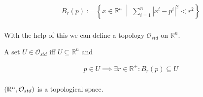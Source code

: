 \begin{align*}
    & B_r(p) := \left\{ x \in \mathbb{R}^n \; \middle| \; \sum_{i=1}^{n} | x^i - p^i |^2 < r^2 \right\} \\
\end{align*}

With the help of this we can define a topology $ \mathcal{O}_{std}$ on $ \mathbb{R}^n$.

\begin{definition}
    A set $ U \in \mathcal{O}_{std}$ iff $ U \subseteq \mathbb{R}^n$ and

    \begin{align*}
        & p \in U \implies \exists r \in \mathbb{R}^+ : B_r(p) \subseteq U \\
    \end{align*}
\end{definition}

\begin{proposition}
    $ \left(  \mathbb{R}^n, \mathcal{O}_{std} \right)$ is a topological space.
\end{proposition}

